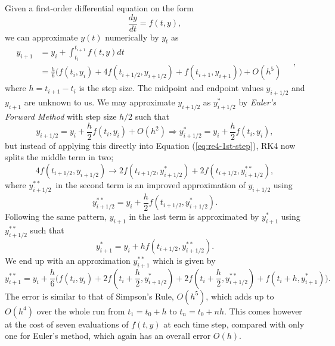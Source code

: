 \documentclass[]{article}
\begin{document}
Given a first-order differential equation on the form
\begin{equation}
	\frac{dy}{dt} = f(t, y),
\end{equation}
we can approximate $y(t)$ numerically by $y_t$ as
\begin{equation}
\begin{aligned} \label{eq:re4-1st-step}
		y_{i+1} &= y_i + \int_{t_i}^{t_{i+1}} f(t,y) dt \\
		&= \frac{h}{6} \big( f(t_i, y_i) + 4f(t_{i+1/2}, y_{i+1/2}) + f(t_{i+1}, y_{i+1}) \big) + O(h^5)
\end{aligned} \quad ,
\end{equation}
where $h=t_{i+1} - t_i$ is the step size. The midpoint and endpoint values $y_{i+1/2}$ and $y_{i+1}$ are unknown to us. We may approximate $y_{i+1/2}$ as $y^*_{i+1/2}$ by \textit{Euler's Forward Method} with step size $h/2$ such that
\begin{equation}
	y_{i+1/2} = y_i + \frac{h}{2} f(t_i, y_i) + O(h^2) \Rightarrow y^*_{i+1/2} = y_i + \frac{h}{2} f(t_i, y_i),
\end{equation}
but instead of applying this directly into Equation (\ref{eq:re4-1st-step}), RK4 now splits the middle term in two;
\begin{equation}
	4f(t_{i+1/2}, y_{i+1/2}) \rightarrow 2f(t_{i+1/2}, y^{*}_{i+1/2}) + 2f(t_{i+1/2}, y^{**}_{i+1/2}),
\end{equation}
where $y^{**}_{i+1/2}$ in the second term is an improved approximation of $y_{i+1/2}$ using
\begin{equation}
	y^{**}_{i+1/2} = y_i + \frac{h}{2} f(t_{i+1/2}, y^{*}_{i+1/2}).
\end{equation}
Following the same pattern, $y_{i+1}$ in the last term is approximated by $y^*_{i+1}$ using $y^{**}_{i+1/2}$ such that
\begin{equation}
	y^{*}_{i+1} = y_i + h f(t_{i+1/2}, y^{**}_{i+1/2}).
\end{equation}
We end up with an approximation $y^{**}_{i+1}$ which is given by
\begin{equation}
	y^{**}_{i+1} = y_i + \frac{h}{6} \big( f(t_i, y_i) + 2f(t_i + \frac{h}{2}, y^*_{i+1/2}) + 2f(t_i + \frac{h}{2}, y^{**}_{i+1/2}) + f(t_i+h, y^*_{i+1}) \big).
\end{equation}
The error is similar to that of Simpson's Rule, $O(h^5)$, which adds up to $O(h^4)$ over the whole run from $t_1=t_0+h$ to $t_n=t_0+nh$. This comes however at the cost of seven evaluations of $f(t,y)$ at each time step, compared with only one for Euler's method, which again has an overall error $O(h)$.
\end{document}
